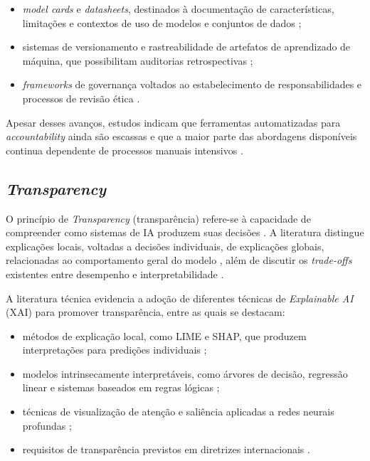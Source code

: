 \begin{itemize}
    \item \textit{model cards} e \textit{datasheets}, destinados à documentação de características, limitações e contextos de uso de modelos e conjuntos de dados \cite{Mitchell2019, Gebru2021, S018, S037};
    \item sistemas de versionamento e rastreabilidade de artefatos de aprendizado de máquina, que possibilitam auditorias retrospectivas \cite{Sculley2015, S008, S016};
    \item \textit{frameworks} de governança voltados ao estabelecimento de responsabilidades e processos de revisão ética \cite{Raji2020, Wieringa2020, S025, S046}.
\end{itemize}

Apesar desses avanços, estudos indicam que ferramentas automatizadas para \textit{accountability} ainda são escassas e que a maior parte das abordagens disponíveis continua dependente de processos manuais intensivos \cite{Raji2020, Mittelstadt2019, S005, S046}.

\subsection{\textit{Transparency}}
\label{sec:transparency}

O princípio de \textit{Transparency} (transparência) refere-se à capacidade de compreender como sistemas de IA produzem suas decisões \cite{Lipton2018,Doshi-Velez2017}. A literatura distingue explicações locais, voltadas a decisões individuais, de explicações globais, relacionadas ao comportamento geral do modelo \cite{Guidotti2018}, além de discutir os \textit{trade-offs} existentes entre desempenho e interpretabilidade \cite{Lipton2018}.

A literatura técnica evidencia a adoção de diferentes técnicas de \textit{Explainable AI} (XAI) para promover transparência, entre as quais se destacam:

\begin{itemize}
    \item métodos de explicação local, como LIME e SHAP, que produzem interpretações para predições individuais \cite{Ribeiro2016, Lundberg2017, S041};
    \item modelos intrinsecamente interpretáveis, como árvores de decisão, regressão linear e sistemas baseados em regras lógicas \cite{Rudin2019, S023, S033};
    \item técnicas de visualização de atenção e saliência aplicadas a redes neurais profundas \cite{Selvaraju2020, S044};
    \item requisitos de transparência previstos em diretrizes internacionais \cite{UNESCO2021, EUAIAct2024}.
\end{itemize}

